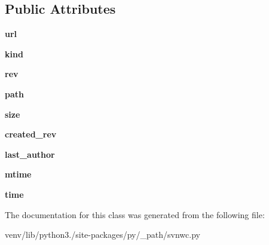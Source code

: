 \subsection*{Public Attributes}
\begin{DoxyCompactItemize}
\item 
\mbox{\label{classpy_1_1__path_1_1svnwc_1_1_info_svn_w_c_command_ad0fab51b4d2b6afe839a10639c579ff3}} 
{\bfseries url}
\item 
\mbox{\label{classpy_1_1__path_1_1svnwc_1_1_info_svn_w_c_command_a1edf1232b557476b74051b324333f6c2}} 
{\bfseries kind}
\item 
\mbox{\label{classpy_1_1__path_1_1svnwc_1_1_info_svn_w_c_command_ac6b56fabd235ae3fa5398b8624e0b475}} 
{\bfseries rev}
\item 
\mbox{\label{classpy_1_1__path_1_1svnwc_1_1_info_svn_w_c_command_a2b991f0683f5472603dd0f3e2acb657c}} 
{\bfseries path}
\item 
\mbox{\label{classpy_1_1__path_1_1svnwc_1_1_info_svn_w_c_command_a7ca1b12b0488f87aae9cde7aba859b24}} 
{\bfseries size}
\item 
\mbox{\label{classpy_1_1__path_1_1svnwc_1_1_info_svn_w_c_command_a4bf5faf0251f90b15f5a34c5e656cc7b}} 
{\bfseries created\+\_\+rev}
\item 
\mbox{\label{classpy_1_1__path_1_1svnwc_1_1_info_svn_w_c_command_a9390bc8ac6b172b93dc8233d5c588d0b}} 
{\bfseries last\+\_\+author}
\item 
\mbox{\label{classpy_1_1__path_1_1svnwc_1_1_info_svn_w_c_command_abeae99889d71341a180a7222149280ff}} 
{\bfseries mtime}
\item 
\mbox{\label{classpy_1_1__path_1_1svnwc_1_1_info_svn_w_c_command_af1ba08c7a07e1ed5e5a01e021069e75f}} 
{\bfseries time}
\end{DoxyCompactItemize}


The documentation for this class was generated from the following file\+:\begin{DoxyCompactItemize}
\item 
venv/lib/python3./site-\/packages/py/\+\_\+path/svnwc.\+py\end{DoxyCompactItemize}
